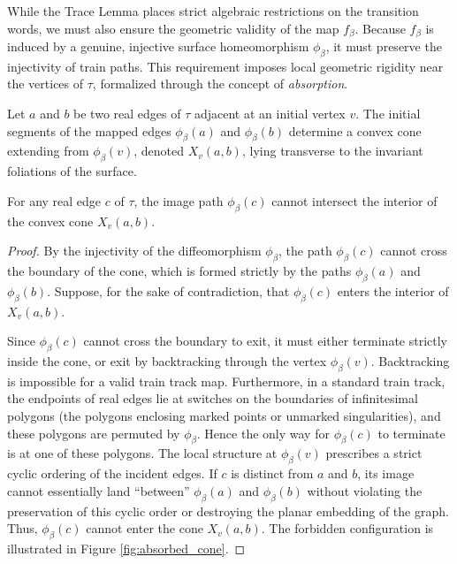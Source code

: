 While the Trace Lemma places strict algebraic restrictions on the transition words, we must also ensure the geometric validity of the map $f_\beta$. Because $f_\beta$ is induced by a genuine, injective surface homeomorphism $\phi_\beta$, it must preserve the injectivity of train paths. This requirement imposes local geometric rigidity near the vertices of $\tau$, formalized through the concept of \textit{absorption}.

\begin{definition}
Let $a$ and $b$ be two real edges of $\tau$ adjacent at an initial vertex $v$. The initial segments of the mapped edges $\phi_\beta(a)$ and $\phi_\beta(b)$ determine a convex cone extending from $\phi_\beta(v)$, denoted $X_v(a,b)$, lying transverse to the invariant foliations of the surface.
\end{definition}

\begin{lemma}
\label{lem:cone_condition}
For any real edge $c$ of $\tau$, the image path $\phi_\beta(c)$ cannot intersect the interior of the convex cone $X_v(a,b)$.
\end{lemma}

\begin{proof}
By the injectivity of the diffeomorphism $\phi_\beta$, the path $\phi_\beta(c)$ cannot cross the boundary of the cone, which is formed strictly by the paths $\phi_\beta(a)$ and $\phi_\beta(b)$. Suppose, for the sake of contradiction, that $\phi_\beta(c)$ enters the interior of $X_v(a,b)$.

Since $\phi_\beta(c)$ cannot cross the boundary to exit, it must either terminate strictly inside the cone, or exit by backtracking through the vertex $\phi_\beta(v)$. Backtracking is impossible for a valid train track map. Furthermore, in a standard train track, the endpoints of real edges lie at switches on the boundaries of infinitesimal polygons (the polygons enclosing marked points or unmarked singularities), and these polygons are permuted by $\phi_\beta$. Hence the only way for $\phi_\beta(c)$ to terminate is at one of these polygons. The local structure at $\phi_\beta(v)$ prescribes a strict cyclic ordering of the incident edges. If $c$ is distinct from $a$ and $b$, its image cannot essentially land ``between'' $\phi_\beta(a)$ and $\phi_\beta(b)$ without violating the preservation of this cyclic order or destroying the planar embedding of the graph. Thus, $\phi_\beta(c)$ cannot enter the cone $X_v(a,b)$. The forbidden configuration is illustrated in Figure \ref{fig:absorbed_cone}.
\end{proof}

